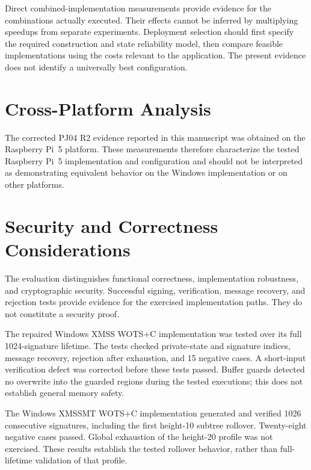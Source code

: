 \documentclass[pdflatex,sn-mathphys-num]{sn-jnl}
\begin{document}
Direct combined-implementation measurements provide evidence for
the combinations actually executed. Their effects cannot be inferred
by multiplying speedups from separate experiments. Deployment
selection should first specify the required construction and state
reliability model, then compare feasible implementations using the
costs relevant to the application. The present evidence does not
identify a universally best configuration.

\section{Cross-Platform Analysis}





The corrected PJ04 R2 evidence reported in this manuscript was obtained on the
Raspberry Pi~5 platform. These measurements therefore characterize the tested
Raspberry Pi~5 implementation and configuration and should not be interpreted
as demonstrating equivalent behavior on the Windows implementation or on
other platforms.

\label{sec:crossplatform}



\section{Security and Correctness Considerations}
\label{sec:security}

The evaluation distinguishes functional correctness, implementation
robustness, and cryptographic security. Successful signing, verification,
message recovery, and rejection tests provide evidence for the exercised
implementation paths. They do not constitute a security proof.

The repaired Windows XMSS WOTS+C implementation was tested over its full
1024-signature lifetime. The tests checked private-state and signature indices,
message recovery, rejection after exhaustion, and 15 negative cases. A
short-input verification defect was corrected before these tests passed.
Buffer guards detected no overwrite into the guarded regions during the
tested executions; this does not establish general memory safety.

The Windows XMSSMT WOTS+C implementation generated and verified 1026
consecutive signatures, including the first height-10 subtree rollover.
Twenty-eight negative cases passed. Global exhaustion of the height-20
profile was not exercised. These results establish the tested rollover
behavior, rather than full-lifetime validation of that profile.
\end{document}
